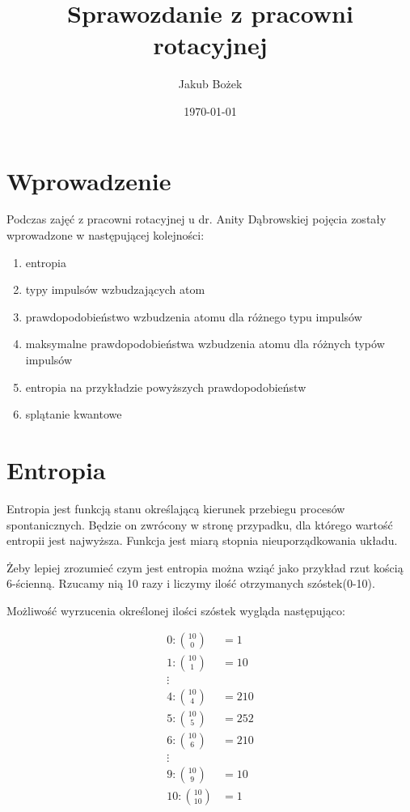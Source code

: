 \documentclass[11pt, a4paper, fleqn]{article}
\title{Sprawozdanie z pracowni rotacyjnej}
\author{Jakub Bożek}
\date{\today}
\begin{document}
\maketitle
\tableofcontents
\newpage


\section{Wprowadzenie}
    Podczas zajęć z pracowni rotacyjnej u dr. Anity Dąbrowskiej
    pojęcia zostały wprowadzone w następującej kolejności:\\
    \begin{enumerate}
        \item entropia
        \item typy impulsów wzbudzających atom
        \item prawdopodobieństwo wzbudzenia atomu dla różnego typu impulsów
        \item maksymalne prawdopodobieństwa wzbudzenia atomu dla różnych typów impulsów
        \item entropia na przykładzie powyższych prawdopodobieństw
        \item splątanie kwantowe
    \end{enumerate}


\section{Entropia}
    Entropia jest funkcją stanu określającą kierunek przebiegu procesów spontanicznych. Będzie on zwrócony w stronę
    przypadku, dla którego wartość entropii jest najwyższa.
    Funkcja jest miarą stopnia nieuporządkowania układu.

    Żeby lepiej zrozumieć czym jest entropia można wziąć jako przykład rzut kością 6-ścienną.
    Rzucamy nią 10 razy i liczymy ilość otrzymanych szóstek(0-10).

    Możliwość wyrzucenia określonej ilości szóstek wygląda następująco:

    \begin{align*}
        0: \binom{10}{0} &=1\\
        1: \binom{10}{1} &= 10\\
        \vdots&\\
        4: \binom{10}{4} &= 210\\
        5: \binom{10}{5} &= 252\\
        6: \binom{10}{6} &= 210\\
        \vdots&\\
        9: \binom{10}{9} &= 10\\
        10: \binom{10}{10} &= 1
    \end{align*}
\end{document}
